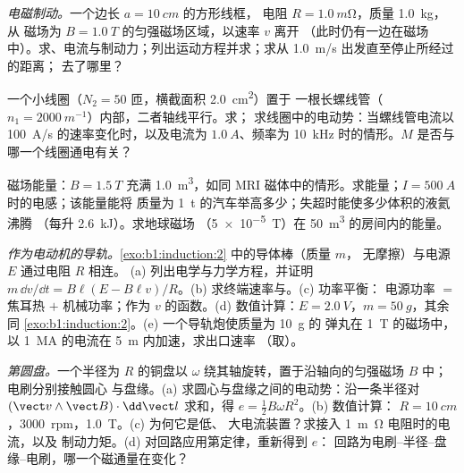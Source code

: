 \begin{exercise}[$\star\star$]\label{exo:b1:induction:7}
\emph{电磁制动。}一个边长 $a = \qty{10}{cm}$ 的方形线框，
电阻 $R = \qty{1.0}{m\ohm}$，质量 \qty{1.0}{kg}，从
磁场为 $B = \qty{1.0}{T}$ 的匀强磁场区域，以速率 $v$ 离开
（此时仍有一边在磁场中）。求、电流与制动力；列出运动方程并求；求从 \qty{1.0}{m/s} 出发直至停止所经过的距离；
去了哪里？
\end{exercise}

\begin{exercise}[$\star\star$]\label{exo:b1:induction:8}
一个小线圈（$N_2 = 50$ 匝，横截面积 \qty{2.0}{cm^2}）置于
一根长螺线管（$n_1 = \qty{2000}{m^{-1}}$）内部，二者轴线平行。求；
求线圈中的电动势：当螺线管电流以
\qty{100}{A/s} 的速率变化时，以及电流为 $\qty{1.0}{A}$、频率为 \qty{10}{kHz} 时的情形。$M$
是否与哪一个线圈通电有关？
\end{exercise}

\begin{exercise}[$\star\star$]\label{exo:b1:induction:9}
磁场能量：$B = \qty{1.5}{T}$ 充满 \qty{1.0}{m^3}，如同 MRI
磁体中的情形。求能量；$I = \qty{500}{A}$ 时的电感；该能量能将
质量为 \qty{1}{t} 的汽车举高多少；失超时能使多少体积的液氦沸腾
（每升 \qty{2.6}{kJ}）。求地球磁场
（\qty{5e-5}{T}）在 \qty{50}{m^3} 的房间内的能量。
\end{exercise}

\begin{exercise}[$\star\star\star$]\label{exo:b1:induction:10}
\emph{作为电动机的导轨。}\cref{exo:b1:induction:2} 中的导体棒（质量 $m$，
无摩擦）与电源 $E$ 通过电阻 $R$ 相连。
(a) 列出电学与力学方程，并证明 $m\,\dd v/\dd t = B\ell(E -
B\ell v)/R$。(b) 求终端速率与。(c) 功率平衡：
电源功率 $=$ 焦耳热 $+$ 机械功率；作为
$v$ 的函数。(d) 数值计算：$E = \qty{2.0}{V}$，$m = \qty{50}{g}$，其余同
\cref{exo:b1:induction:2}。(e) 一个导轨炮使质量为 \qty{10}{g} 的
弹丸在 \qty{1}{T} 的磁场中，以 \qty{1}{MA} 的电流在 \qty{5}{m} 内加速，求出口速率
（取）。
\end{exercise}

\begin{exercise}[$\star\star\star$]\label{exo:b1:induction:11}
\emph{第圆盘。}一个半径为 $R$ 的铜盘以 $\omega$
绕其轴旋转，置于沿轴向的匀强磁场 $B$ 中；电刷分别接触圆心
与盘缘。(a) 求圆心与盘缘之间的电动势：沿一条半径对 $(\vect v\wedge
\vect B)\cdot\dd\vect l$ 求和，得 $e = \tfrac12B\omega R^2$。(b) 数值计算：
$R = \qty{10}{cm}$，\qty{3000}{rpm}，\qty{1.0}{T}。(c) 为何它是低、
大电流装置？求接入 \qty{1}{m\ohm} 电阻时的电流，以及
制动力矩。(d) 对回路应用第定律，重新得到 $e$：
回路为电刷–半径–盘缘–电刷，哪一个磁通量在变化？
\end{exercise}


